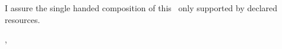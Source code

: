 \thispagestyle{empty}
\vspace*{0.7\textheight}

\noindent I assure the single handed composition of this
\makeatletter\@doctype\makeatother\ only supported by declared resources.

\vspace{1.5cm}
\begin{multicols}{2}
  \begin{center}
    \makeatletter\@location\makeatother, \makeatletter\@date\makeatother
  \end{center}
  \begin{center}
    \makeatletter\@author\makeatother
  \end{center}
\end{multicols}
\clearpage
